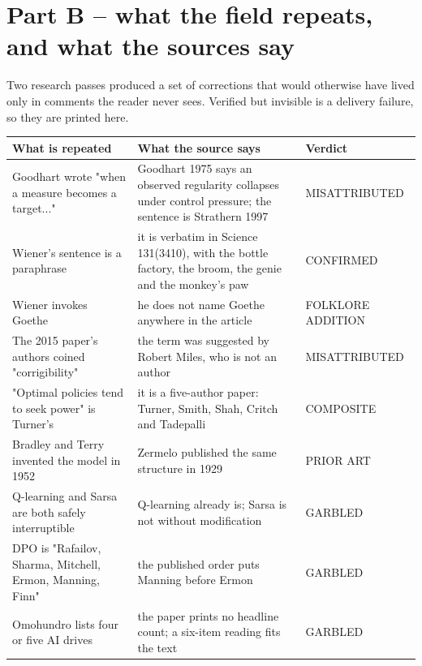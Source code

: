 \chapter*{Part B -- what the field repeats, and what the sources say}

Two research passes produced a set of corrections that would otherwise have lived only in comments the reader never sees. Verified but invisible is a delivery failure, so they are printed here.

\noindent

\noindent
\begin{tabularx}{\textwidth}{XXX}
\toprule
What is repeated & What the source says & Verdict \\
\midrule
Goodhart wrote "when a measure becomes a target..." & Goodhart 1975 says an observed regularity collapses under control pressure; the sentence is Strathern 1997 & MISATTRIBUTED \\
Wiener's sentence is a paraphrase & it is verbatim in Science 131(3410), with the bottle factory, the broom, the genie and the monkey's paw & CONFIRMED \\
Wiener invokes Goethe & he does not name Goethe anywhere in the article & FOLKLORE ADDITION \\
The 2015 paper's authors coined "corrigibility" & the term was suggested by Robert Miles, who is not an author & MISATTRIBUTED \\
"Optimal policies tend to seek power" is Turner's & it is a five-author paper: Turner, Smith, Shah, Critch and Tadepalli & COMPOSITE \\
Bradley and Terry invented the model in 1952 & Zermelo published the same structure in 1929 & PRIOR ART \\
Q-learning and Sarsa are both safely interruptible & Q-learning already is; Sarsa is not without modification & GARBLED \\
DPO is "Rafailov, Sharma, Mitchell, Ermon, Manning, Finn" & the published order puts Manning before Ermon & GARBLED \\
Omohundro lists four or five AI drives & the paper prints no headline count; a six-item reading fits the text & GARBLED \\
\bottomrule
\end{tabularx}
\par\medskip
